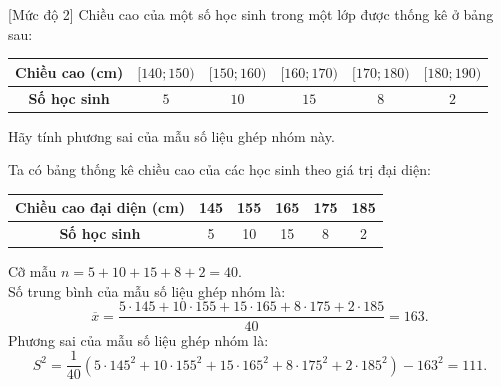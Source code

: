 \begin{bt}%
[Mức độ 2]%
Chiều cao của một số học sinh trong một lớp được thống kê ở bảng sau:
\begin{center}
\begin{tabular}{|c|c|c|c|c|c|}
\hline
\textbf{Chiều cao (cm)} & $[140; 150)$ & $[150; 160)$ & $[160; 170)$ & $[170; 180)$ & $[180; 190)$ \\
\hline
\textbf{Số học sinh} & $5$ & $10$ & $15$ & $8$ & $2$ \\
\hline
\end{tabular}
\end{center}
Hãy tính phương sai của mẫu số liệu ghép nhóm này.
\loigiai
{
Ta có bảng thống kê chiều cao của các học sinh theo giá trị đại diện:
\begin{center}
\begin{tabular}{|c|c|c|c|c|c|}
\hline
\textbf{Chiều cao đại diện (cm)} & 145 & 155 & 165 & 175 & 185 \\
\hline
\textbf{Số học sinh} & 5 & 10 & 15 & 8 & 2 \\
\hline
\end{tabular}
\end{center}
Cỡ mẫu $n=5+10+15+8+2=40$.\\
Số trung bình của mẫu số liệu ghép nhóm là:
\[ \overline{x}=\dfrac{5\cdot 145+10\cdot155+15\cdot165+8\cdot175+2\cdot185}{40}=163. \]
Phương sai của mẫu số liệu ghép nhóm là:
\[ S^2=\dfrac{1}{40}\left(5\cdot145^2+10\cdot 155^2+15\cdot165^2+8\cdot175^2+2\cdot185^2 \right)-163^2=111. \]
}
\end{bt}

